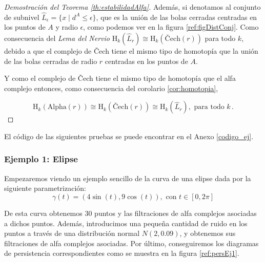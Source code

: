\begin{proof}[Demostración del Teorema \ref{th:estabilidadAlfa}]
Además, si denotamos al conjunto de subnivel $\widehat{L}_\epsilon=\{x \mid d^A \leq \epsilon\}$, que es la unión de las bolas cerradas centradas en los puntos de $A$ y radio $\epsilon$, como podemos ver en la figura \ref{ref:figDistConj}. Como consecuencia del \emph{Lema del Nervio} $\text{H}_k(\widehat{L}_r) \cong \text{H}_k(\text{\v{C}ech}(r))$ para todo $k$, debido a que el complejo de \v{C}ech tiene el mismo tipo de homotopía que la unión de las bolas cerradas de radio $r$ centradas en los puntos de $A$.

Y como el complejo de \v{C}ech tiene el mismo tipo de homotopía que el alfa complejo entonces, como consecuencia del corolario \ref{cor:homotopia},

\[
\text{H}_k(\text{Alpha}(r)) \cong \text{H}_k(\text{\v{C}ech}(r)) \cong \text{H}_k(\widehat{L}_r), \text{ para todo } k\,.
\]
\end{proof}

El código de las siguientes pruebas se puede encontrar en el Anexo \ref{codigo_ej}.

\subsubsection{Ejemplo 1: Elipse}
Empezaremos viendo un ejemplo sencillo de la curva de una elipse dada por la siguiente parametrización:
\[
\gamma(t)= (4\sin(t), 9\cos(t)), \text{ con } t\in [0,2\pi]
\]

De esta curva obtenemos 30 puntos y las filtraciones de alfa complejos asociadas a dichos puntos. Además, introducimos una pequeña cantidad de ruido en los puntos a través de una distribución normal $N(2, 0.09)$, y obtenemos sus filtraciones de alfa complejos asociadas. Por último, conseguiremos los diagramas de persistencia correspondientes como se muestra en la figura \ref{ref:persEj1}.

